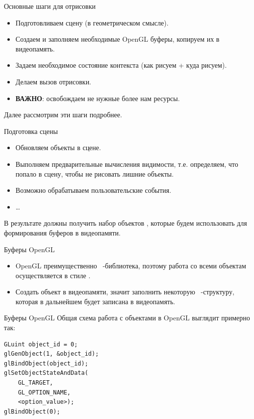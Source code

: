 \documentclass[aspectration=1610,t]{beamer}
\begin{document}
\begin{frame}[fragile]{Основные шаги для отрисовки}
    \begin{itemize}
        \item Подготовливаем сцену (в геометрическом смысле).
        \item Создаем и заполняем необходимые OpenGL буферы, копируем их в видеопамять.
        \item Задаем необходимое состояние контекста (как рисуем + куда рисуем).
        \item Делаем вызов отрисовки.
        \item {\bf ВАЖНО}: освобождаем не нужные более нам ресурсы.
    \end{itemize}
    Далее рассмотрим эти шаги подробнее.
\end{frame}

\begin{frame}[fragile]{Подготовка сцены}
    \begin{itemize}
        \item Обновляем объекты в сцене.
        \item Выполняем предварительные вычисления видимости, 
            т.е. определяем, что попало в сцену, чтобы не рисовать лишние объекты.
        \item Возможно обрабатываем пользовательские события.
        \item \dots
    \end{itemize}
    В результате должны получить набор объектов \langcpp, 
        которые будем использовать для формирования буферов в видеопамяти.
\end{frame}

\begin{frame}[fragile]{Буферы OpenGL}
    \begin{itemize}
        \item OpenGL преимущественно \langc~-библиотека, 
            поэтому работа со всеми объектам осуществляется в стиле \langc.
        \item Создать объект в видеопамяти, значит заполнить некоторую \langc~-структуру,
            которая в дальнейшем будет записана в видеопамять.
    \end{itemize}
\end{frame}

\begin{frame}[fragile]{Буферы OpenGL}
    Общая схема работа с объектами в OpenGL выглядит примерно так:
        {\small \begin{lstlisting}
GLuint object_id = 0;
glGenObject(1, &object_id);
glBindObject(object_id);
glSetObjectStateAndData(
    GL_TARGET,
    GL_OPTION_NAME,
    <option_value>);
glBindObject(0);
        \end{lstlisting}}
\end{frame}
\end{document}
